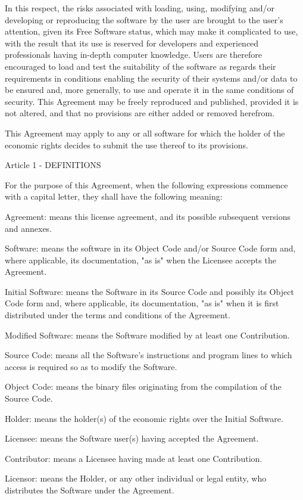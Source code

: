\documentclass[oneside,english,onecolumn,letterpaper]{book}
\begin{document}
In this respect, the risks associated with loading, using, modifying and/or developing or reproducing the software by the user are brought to the user's attention, given its Free Software status, which may make it complicated to use, with the result that its use is reserved for developers and experienced professionals having in-depth computer knowledge. Users are therefore encouraged to load and test the suitability of the software as regards their requirements in conditions enabling the security of their systems and/or data to be ensured and, more generally, to use and operate it in the same conditions of security. This Agreement may be freely reproduced and published, provided it is not altered, and that no provisions are either added or removed herefrom.

This Agreement may apply to any or all software for which the holder of the economic rights decides to submit the use thereof to its provisions.

Article 1 - DEFINITIONS

For the purpose of this Agreement, when the following expressions commence with a capital letter, they shall have the following meaning:

Agreement: means this license agreement, and its possible subsequent versions and annexes.

Software: means the software in its Object Code and/or Source Code form and, where applicable, its documentation, "as is" when the Licensee accepts the Agreement.

Initial Software: means the Software in its Source Code and possibly its Object Code form and, where applicable, its documentation, "as is" when it is first distributed under the terms and conditions of the Agreement.

Modified Software: means the Software modified by at least one Contribution.

Source Code: means all the Software's instructions and program lines to which access is required so as to modify the Software.

Object Code: means the binary files originating from the compilation of the Source Code.

Holder: means the holder(s) of the economic rights over the Initial Software.

Licensee: means the Software user(s) having accepted the Agreement.

Contributor: means a Licensee having made at least one Contribution.

Licensor: means the Holder, or any other individual or legal entity, who distributes the Software under the Agreement.
\end{document}
